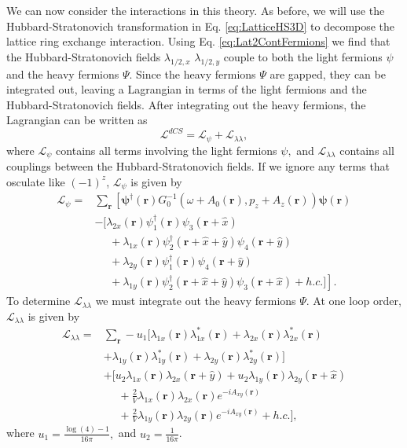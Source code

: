 \documentclass[prb,aps,twocolumn,groupaddress,floatfix]{revtex4-1}
\begin{document}
We can now consider the interactions in this theory. As before, we will use the Hubbard-Stratonovich transformation in Eq. \ref{eq:LatticeHS3D} to decompose the lattice ring exchange interaction. Using Eq. \ref{eq:Lat2ContFermions} we find that the Hubbard-Stratonovich fields $\lambda_{1/2,x}$ $\lambda_{1/2,y}$ couple to both the light fermions $\psi$ and the heavy fermions $\Psi$. Since the heavy fermions $\Psi$ are gapped, they can be integrated out, leaving a Lagrangian in terms of the light fermions and the Hubbard-Stratonovich fields. After integrating out the heavy fermions, the Lagrangian can be written as
\begin{equation}
\mathcal{L}^{dCS} = \mathcal{L}_{\psi} + \mathcal{L}_{\lambda\lambda}, 
\end{equation}
where $\mathcal{L}_{\psi}$ contains all terms involving the light fermions $\psi,$ and $\mathcal{L}_{\lambda\lambda}$ contains all couplings between the Hubbard-Stratonovich fields. If we ignore any terms that osculate like $(-1)^z$, $\mathcal{L}_{\psi}$ is given by
\begin{equation}
\begin{split}
\mathcal{L}_{\psi} = &\sum_{\bm{r}} \left[\bm{\psi}^\dagger(\bm{r})G^{-1}_0(\omega+A_0(\bm{r}),p_z+A_z(\bm{r}))\bm{\psi}(\bm{r})\right.\\& - [ \lambda_{2x}(\bm{r}) \psi_1^\dagger(\bm{r})\psi_3(\bm{r}+\hat{x}) \\
&\phantom{=} + \lambda_{1x}(\bm{r})\psi_2^\dagger(\bm{r}+\hat{x}+\hat{y})\psi_4(\bm{r}+\hat{y}) \\
&\phantom{=}+\lambda_{2y}(\bm{r})\psi_1^\dagger(\bm{r})\psi_4(\bm{r}+\hat{y})\\
&\phantom{=}+\left.\lambda_{1y}(\bm{r})\psi_2^\dagger(\bm{r}+\hat{x}+\hat{y})\psi_3(\bm{r}+\hat{x}) + h.c.]\right].
\end{split}\label{eq:ContHS}
\end{equation}
To determine $\mathcal{L}_{\lambda\lambda}$ we must integrate out the heavy fermions $\Psi$. At one loop order, $\mathcal{L}_{\lambda\lambda}$ is given by
\begin{equation}
\begin{split}
\mathcal{L}_{\lambda\lambda} = &\sum_{\bm{r}} -u_1 [\lambda_{1x}(\bm{r})\lambda^*_{1x}(\bm{r})+ \lambda_{2x}(\bm{r})\lambda^*_{2x}(\bm{r}) \\
&+ \lambda_{1y}(\bm{r})\lambda^*_{1y}(\bm{r})+ \lambda_{2y}(\bm{r})\lambda^*_{2y}(\bm{r})] \\
&+ [u_2 \lambda_{1x}(\bm{r})\lambda_{2x}(\bm{r}+\hat{y}) + u_2 \lambda_{1y}(\bm{r})\lambda_{2y}(\bm{r}+\hat{x}) \\
&\phantom{=} + \frac{2}{V}\lambda_{1x}(\bm{r})\lambda_{2x}(\bm{r})e^{-iA_{xy}(\bm{r})}\\ &\phantom{=} + \frac{2}{V}\lambda_{1y}(\bm{r})\lambda_{2y}(\bm{r})e^{-iA_{xy}(\bm{r})}
+ h.c.],
\end{split}\label{eq:AdditionalInteractions}
\end{equation}
where $u_1 = \frac{\log(4)-1}{16\pi},$ and $u_2 = \frac{1}{16\pi}$. 
\end{document}

